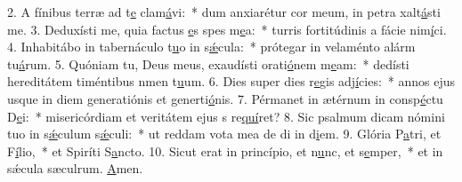 2. A fínibus terræ ad t\uline{e} clam\uline{á}vi:~* dum anxiarétur cor meum, in petra xalt\uline{á}sti me.
3. Deduxísti me, quia factus \uline{e}s spes m\uline{e}a:~* turris fortitúdinis a fácie nim\uline{í}ci.
4. Inhabitábo in tabernáculo t\uline{u}o in s\uline{ǽ}cula:~* prótegar in velaménto alárm tu\uline{á}rum.
5. Quóniam tu, Deus meus, exaudísti orati\uline{ó}nem m\uline{e}am:~* dedísti hereditátem timéntibus nmen t\uline{u}um.
6. Dies super dies r\uline{e}gis adj\uline{í}cies:~* annos ejus usque in diem generatiónis et generti\uline{ó}nis.
7. Pérmanet in ætérnum in consp\uline{é}ctu D\uline{e}i:~* misericórdiam et veritátem ejus s re\uline{quí}ret?
8. Sic psalmum dicam nómini tuo in s\uline{ǽ}culum s\uline{ǽ}culi:~* ut reddam vota mea de di in d\uline{i}em.
9. Glória P\uline{a}tri, et F\uline{í}lio,~* et Spiríti S\uline{a}ncto.
10. Sicut erat in princípio, et n\uline{u}nc, et s\uline{e}mper,~* et in sǽcula sæculrum. \uline{A}men.
